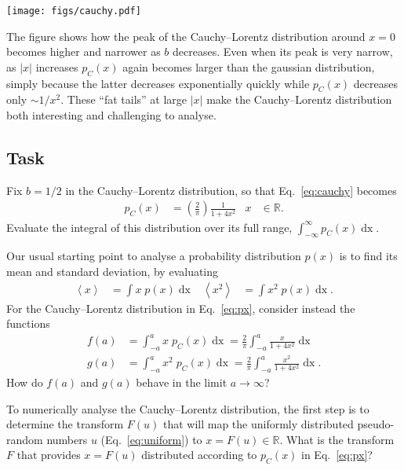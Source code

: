 \documentclass[12 pt]{article} %
\newcommand{\Rbb}{\ensuremath{\mathbb R} }
\renewcommand{\d}[1]{\ensuremath{\mathop{d#1}} }
\newcommand{\vev}[1]{\ensuremath{\left\langle #1 \right\rangle} }
\newcommand{\eq}[1]{Eq.~\ref{#1}}
\newcommand{\showmarks}[1]{\rightline{\texttt{[#1 marks]}}} %
\begin{document}
\begin{center}\texttt{[image: figs/cauchy.pdf]}\end{center}

The figure shows how the peak of the Cauchy--Lorentz distribution around $x = 0$ becomes higher and narrower as $b$ decreases.
Even when its peak is very narrow, as $|x|$ increases $p_C(x)$ again becomes larger than the gaussian distribution, simply because the latter decreases exponentially quickly while $p_C(x)$ decreases only $\sim 1 / x^2$.
These ``fat tails'' at large $|x|$ make the Cauchy--Lorentz distribution both interesting and challenging to analyse.

\newpage %
\subsection*{Task}
Fix $b = 1 / 2$ in the Cauchy--Lorentz distribution, so that \eq{eq:cauchy} becomes
\begin{align}
  \label{eq:px}
  p_C(x) & = \left(\frac{2}{\pi}\right) \frac{1}{1 + 4x^2} &
  x & \in \Rbb.
\end{align}
Evaluate the integral of this distribution over its full range, $\displaystyle \int_{-\infty}^{\infty} p_C(x) \d{x}$.

\showmarks{2}

Our usual starting point to analyse a probability distribution $p(x)$ is to find its mean and standard deviation, by evaluating
\begin{align*}
  \vev{x} & = \int x \; p(x) \d{x} &
  \vev{x^2} & = \int x^2 \; p(x) \d{x}.
\end{align*}
For the Cauchy--Lorentz distribution in \eq{eq:px}, consider instead the functions
\begin{align*}
  f(a) & = \int_{-a}^a x \; p_C(x) \d{x} = \frac{2}{\pi} \int_{-a}^a \frac{x}{1 + 4x^2} \d{x} \\
  g(a) & = \int_{-a}^a x^2 \; p_C(x) \d{x} = \frac{2}{\pi} \int_{-a}^a \frac{x^2}{1 + 4x^2} \d{x}.
\end{align*}
How do $f(a)$ and $g(a)$ behave in the limit $a \to \infty$?

\showmarks{4}

To numerically analyse the Cauchy--Lorentz distribution, the first step is to determine the transform $F(u)$ that will map the uniformly distributed pseudo-random numbers $u$ (\eq{eq:uniform}) to $x = F(u) \in \Rbb$.
What is the transform $F$ that provides $x = F(u)$ distributed according to $p_C(x)$ in \eq{eq:px}?
\end{document}
